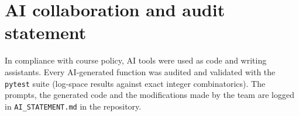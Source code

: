 \documentclass[11pt,a4paper]{article}
\begin{document}
\appendix
\section{AI collaboration and audit statement}
In compliance with course policy, AI tools were used as code and writing
assistants. Every AI-generated function was audited and validated with the
\texttt{pytest} suite (log-space results against exact integer combinatorics).
The prompts, the generated code and the modifications made by the team are
logged in \texttt{AI\_STATEMENT.md} in the repository.
\end{document}
